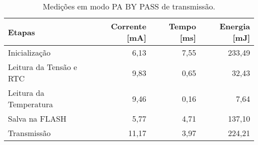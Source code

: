 \begin{table}
\centering
\caption{Medições em modo PA BY PASS de transmissão.}
\label{tab:PA_BY_PASS}
\begin{tabular}{lrrr}
\toprule
                 Etapas &  Corrente [mA] &  Tempo [ms] &  Energia [mJ] \\
\midrule
          Inicialização &           6,13 &        7,55 &        233,49 \\
Leitura da Tensão e RTC &           9,83 &        0,65 &         32,43 \\
 Leitura da Temperatura &           9,46 &        0,16 &          7,64 \\
         Salva na FLASH &           5,77 &        4,71 &        137,10 \\
            Transmissão &          11,17 &        3,97 &        224,21 \\
\bottomrule
\end{tabular}
\end{table}
